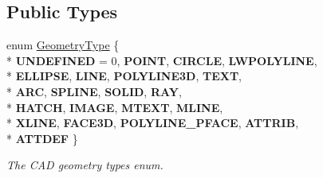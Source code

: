 \subsection*{Public Types}
\begin{DoxyCompactItemize}
\item 
enum \hyperlink{class_c_a_d_geometry_a0515ed61d3514d528f78b8ba6c4fc5f3}{Geometry\+Type} \{ \\*
{\bfseries U\+N\+D\+E\+F\+I\+N\+ED} = 0, 
{\bfseries P\+O\+I\+NT}, 
{\bfseries C\+I\+R\+C\+LE}, 
{\bfseries L\+W\+P\+O\+L\+Y\+L\+I\+NE}, 
\\*
{\bfseries E\+L\+L\+I\+P\+SE}, 
{\bfseries L\+I\+NE}, 
{\bfseries P\+O\+L\+Y\+L\+I\+N\+E3D}, 
{\bfseries T\+E\+XT}, 
\\*
{\bfseries A\+RC}, 
{\bfseries S\+P\+L\+I\+NE}, 
{\bfseries S\+O\+L\+ID}, 
{\bfseries R\+AY}, 
\\*
{\bfseries H\+A\+T\+CH}, 
{\bfseries I\+M\+A\+GE}, 
{\bfseries M\+T\+E\+XT}, 
{\bfseries M\+L\+I\+NE}, 
\\*
{\bfseries X\+L\+I\+NE}, 
{\bfseries F\+A\+C\+E3D}, 
{\bfseries P\+O\+L\+Y\+L\+I\+N\+E\+\_\+\+P\+F\+A\+CE}, 
{\bfseries A\+T\+T\+R\+IB}, 
\\*
{\bfseries A\+T\+T\+D\+EF}
 \}\hypertarget{class_c_a_d_geometry_a0515ed61d3514d528f78b8ba6c4fc5f3}{}\label{class_c_a_d_geometry_a0515ed61d3514d528f78b8ba6c4fc5f3}
\begin{DoxyCompactList}\small\item\em The C\+AD geometry types enum. \end{DoxyCompactList}
\end{DoxyCompactItemize}

